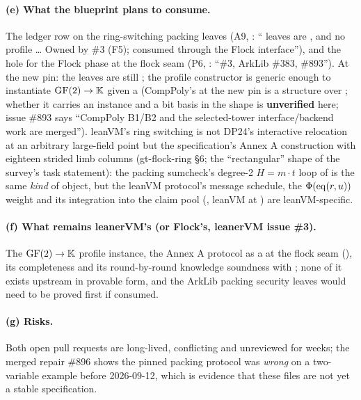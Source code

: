 \paragraph{(e) What the blueprint plans to consume.}
The ledger row on the ring-switching packing leaves (A9, : ``
leaves are , and no  profile \ldots{} Owned by \#3 (F5);
consumed through the Flock interface''), and the hole for the Flock phase at the flock seam (P6,
: ``\#3, ArkLib \#383, \#893''). At the new pin: the leaves are still ;
the profile constructor  is generic enough to instantiate
$\mathrm{GF}(2) \to \mathbb{K}$ given a  (CompPoly's
 at the new pin is a structure over ; whether it carries an
 instance and a bit basis in the shape  is
\textbf{unverified} here; issue \#893 says ``CompPoly B1/B2 and the selected-tower
interface/backend work are merged''). leanVM's ring switching is not DP24's interactive
relocation at an arbitrary large-field point but the specification's Annex A construction with
eighteen strided limb columns (gt-flock-ring §6; the ``rectangular'' shape of the survey's task
statement): the packing sumcheck's degree-2 $H = m \cdot t$ loop of  is
the same \emph{kind} of object, but the leanVM protocol's message schedule, the
$\Phi(\mathrm{eq}(r,u))$ weight and its integration into the claim pool (,
leanVM at ) are leanVM-specific.

\paragraph{(f) What remains leanerVM's (or Flock's, leanerVM issue \#3).}
The $\mathrm{GF}(2) \to \mathbb{K}$ profile instance, the Annex A protocol as a  at the
flock seam (), its completeness and its round-by-round knowledge soundness
with ; none of it exists upstream in provable form, and the ArkLib packing
security leaves would need to be proved first if consumed.

\paragraph{(g) Risks.}
Both open pull requests are long-lived, conflicting and unreviewed for weeks; the merged repair
\#896 shows the pinned packing protocol was \emph{wrong} on a two-variable example before
2026-09-12, which is evidence that these files are not yet a stable specification.

